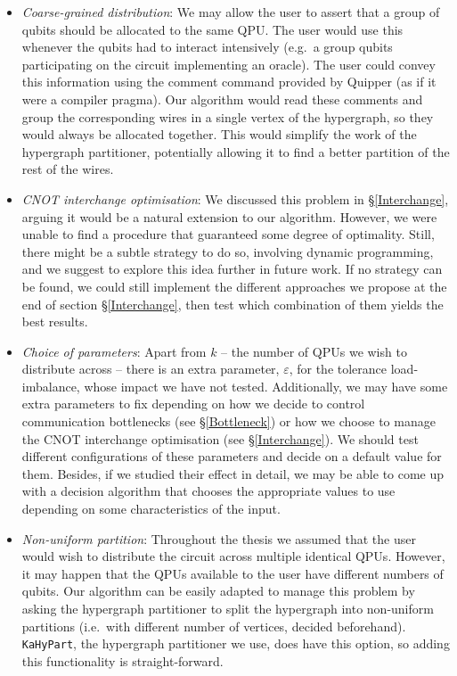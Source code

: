 \begin{itemize}
  \item \textit{Coarse-grained distribution}: We may allow the user to assert that a group of qubits should be allocated to the same QPU. The user would use this whenever the qubits had to interact intensively (e.g.\ a group qubits participating on the circuit implementing an oracle). The user could convey this information using the comment command provided by Quipper (as if it were a compiler pragma). Our algorithm would read these comments and group the corresponding wires in a single vertex of the hypergraph, so they would always be allocated together. This would simplify the work of the hypergraph partitioner, potentially allowing it to find a better partition of the rest of the wires.
  \item \textit{CNOT interchange optimisation}: We discussed this problem in \S\ref{Interchange}, arguing it would be a natural extension to our algorithm. However, we were unable to find a procedure that guaranteed some degree of optimality. Still, there might be a subtle strategy to do so, involving dynamic programming, and we suggest to explore this idea further in future work. If no strategy can be found, we could still implement the different approaches we propose at the end of section \S\ref{Interchange}, then test which combination of them yields the best results.
  \item \textit{Choice of parameters}: Apart from \(k\) -- the number of QPUs we wish to distribute across -- there is an extra parameter, \(\varepsilon\), for the tolerance load-imbalance, whose impact we have not tested. Additionally, we may have some extra parameters to fix depending on how we decide to control communication bottlenecks (see \S\ref{Bottleneck}) or how we choose to manage the CNOT interchange optimisation (see \S\ref{Interchange}). We should test different configurations of these parameters and decide on a default value for them. Besides, if we studied their effect in detail, we may be able to come up with a decision algorithm that chooses the appropriate values to use depending on some characteristics of the input.
  \item \textit{Non-uniform partition}: Throughout the thesis we assumed that the user would wish to distribute the circuit across multiple identical QPUs. However, it may happen that the QPUs available to the user have different numbers of qubits. Our algorithm can be easily adapted to manage this problem by asking the hypergraph partitioner to split the hypergraph into non-uniform partitions (i.e.\ with different number of vertices, decided beforehand). \texttt{KaHyPart}, the hypergraph partitioner we use, does have this option, so adding this functionality is straight-forward.

\end{itemize}
